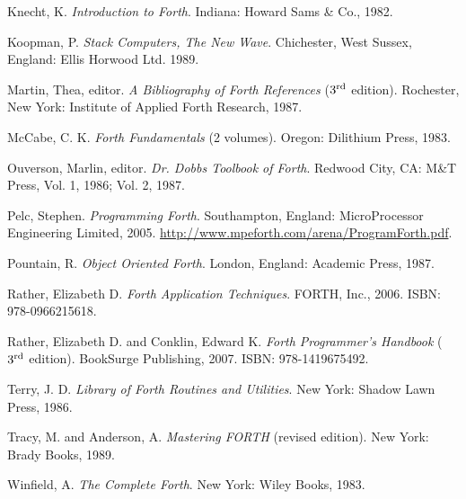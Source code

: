 \begin{description}
\begin{description}
	\item Knecht, K.
		\emph{Introduction to Forth}.
		Indiana: Howard Sams \& Co., 1982.

	\item Koopman, P.
		\emph{Stack Computers, The New Wave}.
		Chichester, West Sussex, England: Ellis Horwood Ltd. 1989.

	\item Martin, Thea, editor.
		\emph{A Bibliography of Forth References} ($3^{\textrm{\scriptsize rd}}$ edition).
		Rochester, New York: Institute of Applied Forth Research, 1987.

	\item McCabe, C. K.
		\emph{Forth Fundamentals} (2 volumes).
		Oregon: Dilithium Press, 1983.

	\item Ouverson, Marlin, editor.
		\emph{Dr. Dobbs Toolbook of Forth}.
		Redwood City, CA: M\&T Press, Vol. 1, 1986; Vol. 2, 1987.

	\item Pelc, Stephen.
		\emph{Programming Forth}.
		Southampton, England: MicroProcessor Engineering Limited, 2005.
		\url{http://www.mpeforth.com/arena/ProgramForth.pdf}.

	\item Pountain, R.
		\emph{Object Oriented Forth}.
		London, England: Academic Press, 1987.

	\item Rather, Elizabeth D.
		\emph{Forth Application Techniques}.
		FORTH, Inc., 2006.
		ISBN: 978-0966215618.

	\item Rather, Elizabeth D. and Conklin, Edward K.
		\emph{Forth Programmer's Handbook} ($3^{\textrm{\scriptsize rd}}$ edition).
		\linebreak BookSurge Publishing, 2007.
		ISBN: 978-1419675492.

	\item Terry, J. D.
		\emph{Library of Forth Routines and Utilities}.
		New York: Shadow Lawn Press, 1986.

	\item Tracy, M. and Anderson, A.
		\emph{Mastering FORTH} (revised edition).
		New York: Brady Books, 1989.

	\item Winfield, A.
		\emph{The Complete Forth}.
		New York: Wiley Books, 1983.
	\end{description}


\item[Journals, magazines and newsletters]~


\end{description}
